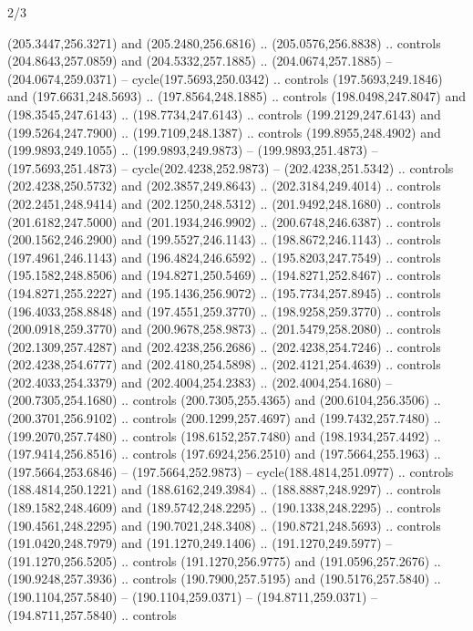 \begin{flagdescription}{2/3}
\begin{scope}[xshift=0.5\flaglength,yshift=0.5\flagwidth,scale=\flagwidth/235.81]
\begin{scope}[y=0.8pt, x=0.8pt, yscale=-1,shift={(-239.08,-147.38)}]
    (205.3447,256.3271) and (205.2480,256.6816) .. (205.0576,256.8838) .. controls
    (204.8643,257.0859) and (204.5332,257.1885) .. (204.0674,257.1885) --
    (204.0674,259.0371) -- cycle(197.5693,250.0342) .. controls
    (197.5693,249.1846) and (197.6631,248.5693) .. (197.8564,248.1885) .. controls
    (198.0498,247.8047) and (198.3545,247.6143) .. (198.7734,247.6143) .. controls
    (199.2129,247.6143) and (199.5264,247.7900) .. (199.7109,248.1387) .. controls
    (199.8955,248.4902) and (199.9893,249.1055) .. (199.9893,249.9873) --
    (199.9893,251.4873) -- (197.5693,251.4873) -- cycle(202.4238,252.9873) --
    (202.4238,251.5342) .. controls (202.4238,250.5732) and (202.3857,249.8643) ..
    (202.3184,249.4014) .. controls (202.2451,248.9414) and (202.1250,248.5312) ..
    (201.9492,248.1680) .. controls (201.6182,247.5000) and (201.1934,246.9902) ..
    (200.6748,246.6387) .. controls (200.1562,246.2900) and (199.5527,246.1143) ..
    (198.8672,246.1143) .. controls (197.4961,246.1143) and (196.4824,246.6592) ..
    (195.8203,247.7549) .. controls (195.1582,248.8506) and (194.8271,250.5469) ..
    (194.8271,252.8467) .. controls (194.8271,255.2227) and (195.1436,256.9072) ..
    (195.7734,257.8945) .. controls (196.4033,258.8848) and (197.4551,259.3770) ..
    (198.9258,259.3770) .. controls (200.0918,259.3770) and (200.9678,258.9873) ..
    (201.5479,258.2080) .. controls (202.1309,257.4287) and (202.4238,256.2686) ..
    (202.4238,254.7246) .. controls (202.4238,254.6777) and (202.4180,254.5898) ..
    (202.4121,254.4639) .. controls (202.4033,254.3379) and (202.4004,254.2383) ..
    (202.4004,254.1680) -- (200.7305,254.1680) .. controls (200.7305,255.4365) and
    (200.6104,256.3506) .. (200.3701,256.9102) .. controls (200.1299,257.4697) and
    (199.7432,257.7480) .. (199.2070,257.7480) .. controls (198.6152,257.7480) and
    (198.1934,257.4492) .. (197.9414,256.8516) .. controls (197.6924,256.2510) and
    (197.5664,255.1963) .. (197.5664,253.6846) -- (197.5664,252.9873) --
    cycle(188.4814,251.0977) .. controls (188.4814,250.1221) and
    (188.6162,249.3984) .. (188.8887,248.9297) .. controls (189.1582,248.4609) and
    (189.5742,248.2295) .. (190.1338,248.2295) .. controls (190.4561,248.2295) and
    (190.7021,248.3408) .. (190.8721,248.5693) .. controls (191.0420,248.7979) and
    (191.1270,249.1406) .. (191.1270,249.5977) -- (191.1270,256.5205) .. controls
    (191.1270,256.9775) and (191.0596,257.2676) .. (190.9248,257.3936) .. controls
    (190.7900,257.5195) and (190.5176,257.5840) .. (190.1104,257.5840) --
    (190.1104,259.0371) -- (194.8711,259.0371) -- (194.8711,257.5840) .. controls

\end{scope}
\end{scope}
\end{flagdescription}
